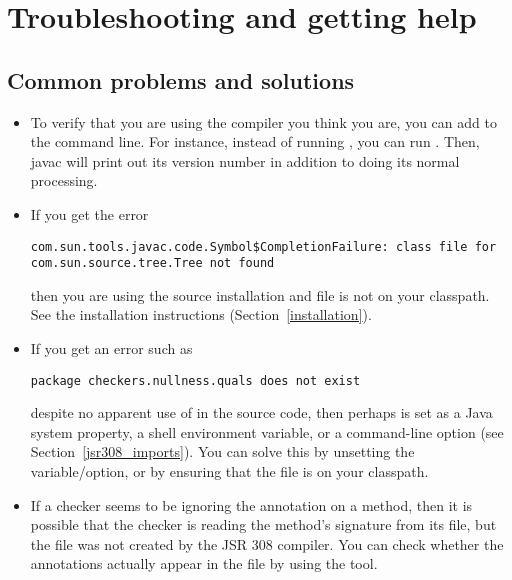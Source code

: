 \section{Troubleshooting and getting help\label{troubleshooting}}

\subsection{Common problems and solutions\label{common-problems}}

\begin{itemize}

\item
To verify that you are using the compiler you think you are, you can add
 to the command line.  For instance, instead of running
, you can run .  Then, javac will print out its version number in addition
to doing its normal processing.


\item
If you get the error

\begin{smaller}
\begin{Verbatim}
com.sun.tools.javac.code.Symbol$CompletionFailure: class file for com.sun.source.tree.Tree not found
\end{Verbatim}
\end{smaller}

\noindent
then you are using the source installation and file  is not
on your classpath.  See the installation instructions
(Section~\ref{installation}).


\item
If you get an error such as

\begin{Verbatim}
package checkers.nullness.quals does not exist
\end{Verbatim}

  \noindent
  despite no apparent use of  in
  the source code, then perhaps
   is set as a Java system property, a shell
  environment variable, or a command-line option (see
  Section~\ref{jsr308_imports}).  You can solve this by unsetting the
  variable/option, or by ensuring that the  file is on
  your classpath.


\item
If a checker seems to be ignoring the annotation on a method, then it is
possible that the checker is reading the method's signature from its
 file, but the  file was not created by the JSR
308 compiler.  You can check whether the annotations actually appear in the
 file by using the  tool.


\end{itemize}
